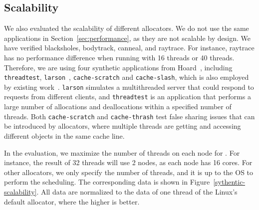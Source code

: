 \subsection{Scalability}
\label{sec:scale}

We also evaluated the scalability of different allocators. We do not use the same applications in Section~\ref{sec:performance}, as they are not scalable by design. We have verified blacksholes, bodytrack, canneal, and raytrace. For instance, raytrace has no performance difference when running with 16 threads or 40 threads. Therefore, we are using four synthetic applications from Hoard~\cite{Hoard}, including \texttt{threadtest}, \texttt{larson}~\cite{Larson}, \texttt{cache-scratch} and \texttt{cache-slash}, which is also employed by existing work~\cite{Scalloc}. \texttt{larson} simulates a multithreaded server that could respond to requests from different clients, and \texttt{threadtest} is an application that performs a large number of allocations and deallocations within a specified number of threads. Both \texttt{cache-scratch} and \texttt{cache-thrash} test false sharing issues that can be introduced by allocators, where multiple threads are getting and accessing different objects in the same cache line.  

In the evaluation, we maximize the number of threads on each node for \NM{}. For instance, the result of 32 threads will use 2 nodes, as each node has 16 cores. For other allocators, we only specify the number of threads, and it is up to the OS to perform the scheduling. The corresponding data is shown in Figure~\ref{sythentic-scalability}. All data are normalized to the data of one thread of the Linux's default allocator, where the higher is better.  

